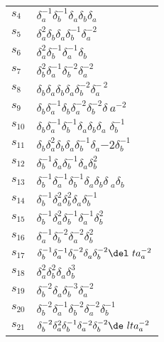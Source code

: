 \documentclass{article}
\begin{document}
\begin{center}
\begin{tabular}{ll}
$s_{4}$ & $\delta_a^{-1}\delta_b^{-1}\delta_a^{}\delta_b^{}\delta_a^{}$ \\
$s_{5}$ & $\delta_a^{2}\delta_b^{}\delta_a^{}\delta_b^{-1}\delta_a^{-2}$ \\
$s_{6}$ & $\delta_a^{2}\delta_b^{-1}\delta_a^{-1}\delta_b^{}$ \\
$s_{7}$ & $\delta_b^{2}\delta_a^{-1}\delta_b^{-2}\delta_a^{-2}$ \\
$s_{8}$ & $\delta_b^{}\delta_a^{}\delta_b^{}\delta_a^{}\delta_b^{-2}\delta_a^{-\
2}$ \\
$s_{9}$ & $\delta_b^{}\delta_a^{-1}\delta_b^{}\delta_a^{-2}\delta_b^{-2}\delta_\
a^{-2}$ \\
$s_{10}$ & $\delta_b^{}\delta_a^{-1}\delta_b^{-1}\delta_a^{}\delta_b^{}\delta_a\
^{}\delta_b^{-1}$ \\
$s_{11}$ & $\delta_b^{}\delta_a^{2}\delta_b^{}\delta_a^{}\delta_b^{-1}\delta_a^\
{-2}\delta_b^{-1}$ \\
$s_{12}$ & $\delta_b^{-1}\delta_a^{}\delta_b^{-1}\delta_a^{}\delta_b^{2}$ \\
$s_{13}$ & $\delta_b^{-1}\delta_a^{-1}\delta_b^{-1}\delta_a^{}\delta_b^{}\delta\
_a^{}\delta_b^{}$ \\
$s_{14}$ & $\delta_b^{-1}\delta_a^{2}\delta_b^{2}\delta_a^{}\delta_b^{-1}$ \\
$s_{15}$ & $\delta_b^{-1}\delta_a^{2}\delta_b^{-1}\delta_a^{-1}\delta_b^{2}$ \\
$s_{16}$ & $\delta_a^{-1}\delta_b^{-2}\delta_a^{-2}\delta_b^{2}$ \\
$s_{17}$ & $\delta_b^{-1}\delta_a^{-1}\delta_b^{-2}\delta_a^{}\delta_b^{-2}\del\
ta_a^{-2}$ \\
$s_{18}$ & $\delta_a^{2}\delta_b^{2}\delta_a^{}\delta_b^{3}$ \\
$s_{19}$ & $\delta_b^{-2}\delta_a^{}\delta_b^{-3}\delta_a^{-2}$ \\
$s_{20}$ & $\delta_b^{-2}\delta_a^{-1}\delta_b^{-2}\delta_a^{-2}\delta_b^{-1}$ 
\\
$s_{21}$ & $\delta_b^{-2}\delta_a^{2}\delta_b^{-1}\delta_a^{-2}\delta_b^{-2}\de\
lta_a^{-2}$ \\
\bottomrule
\end{tabular}
\end{center}

\thispagestyle{empty}
\end{document}
